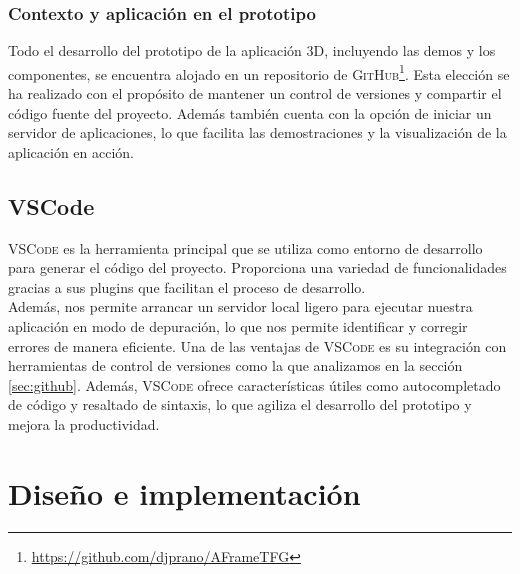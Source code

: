 \documentclass[a4paper, 11pt]{book}
\begin{document}
\subsection{Contexto y aplicación en el prototipo}
Todo el desarrollo del prototipo de la aplicación \textsc{3D}, incluyendo las demos y los componentes, se encuentra alojado en un repositorio de \textsc{GitHub}\footnote{\url{https://github.com/djprano/AFrameTFG}}. Esta elección se ha realizado con el propósito de mantener un control de versiones y compartir el código fuente del proyecto.
Además también cuenta con la opción de iniciar un servidor de aplicaciones, lo que facilita las demostraciones y la visualización de la aplicación en acción.

\section{VSCode}
\textsc{VSCode} es la herramienta principal que se utiliza como entorno de desarrollo para generar el código del proyecto. Proporciona una variedad de funcionalidades gracias a sus plugins que facilitan el proceso de desarrollo. \\
Además, nos permite arrancar un servidor local ligero para ejecutar nuestra aplicación en modo de depuración, lo que nos permite identificar y corregir errores de manera eficiente.
Una de las ventajas de \textsc{VSCode} es su integración con herramientas de control de versiones como la que analizamos en la sección \ref{sec:github}. Además, \textsc{VSCode} ofrece características útiles como autocompletado de código y resaltado de sintaxis, lo que agiliza el desarrollo del prototipo y mejora la productividad.




\clearpage
\chapter{Diseño e implementación}
\label{sec:diseno}
\end{document}
